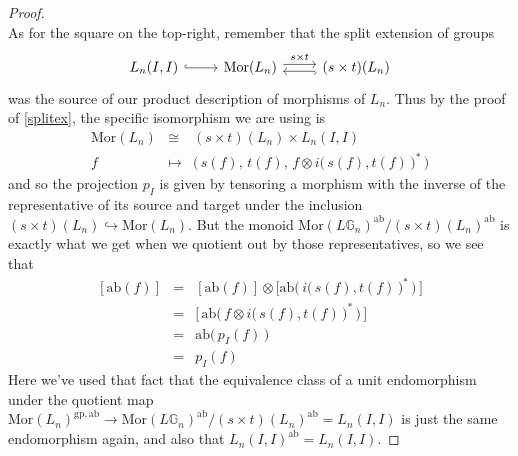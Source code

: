 \documentclass{amsbook} %
\numberwithin{section}{chapter}
\begin{document}
\begin{proof}
\[\]
As for the square on the top-right, remember that the split extension of groups
\[ \begin{tikzcd}
L_n(I,I) \ar[r, hookrightarrow] & \mathrm{Mor}(L_n) \ar[r, shift left, "s \times t"] & (s \times t)(L_n) \ar[l, shift left, hookrightarrow, ""]
\end{tikzcd} \]
was the source of our product description of morphisms of $L_n$. Thus by the proof of \cref{splitex}, the specific isomorphism we are using is
\[ \begin{array}{rll}
			\mathrm{Mor}(L_n) & \cong & (s \times t)(L_n) \times L_n(I,I) \\
			f & \mapsto & \Big( \, s(f), \, t(f), \, f \otimes i\big( \, s(f), t(f) \, \big)^* \, \Big)
		\end{array}
\]
and so the projection $p_I$ is given by tensoring a morphism with the inverse of the representative of its source and target under the inclusion $(s \times t)(L_n) \hookrightarrow \mathrm{Mor}(L_n)$. But the monoid $\mathrm{Mor}(L\mathbb{G}_{n})^{\mathrm{ab}}/(s \times t)(L_n)^{\mathrm{ab}}$ is exactly what we get when we quotient out by those representatives, so we see that
\[ \begin{array}{rll}
			[\mathrm{ab}(f)] & = &  [\mathrm{ab}(f)] \otimes \Big[ \mathrm{ab}\Big( \, i\big( \, s(f), t(f) \, \big)^* \, \Big) \, \Big] \\
			& = & \Big[ \, \mathrm{ab}\Big( \, f \otimes i\big( \, s(f), t(f) \, \big)^* \, \Big) \, \Big] \\
			& = & \mathrm{ab}\big( \, p_I(f) \, \big) \\
			& = & p_I(f)
		\end{array}
\]
Here we've used that fact that the equivalence class of a unit endomorphism under the quotient map $\mathrm{Mor}(L_n)^{\mathrm{gp},\mathrm{ab}} \to \mathrm{Mor}(L\mathbb{G}_{n})^{\mathrm{ab}}/(s \times t)(L_n)^{\mathrm{ab}} = L_n(I,I)$ is just the same endomorphism again, and also that $L_n(I,I)^{\mathrm{ab}} = L_n(I,I)$. 


\end{proof}
\end{document}
